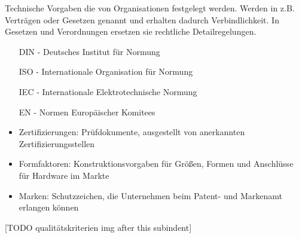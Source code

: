     \begin{tcolorbox}[width=11cm, center, title=Normen, coltitle=white, colframe=orange, colback=white!60!orange]
        Technische Vorgaben die von Organisationen festgelegt werden. Werden in z.B. Verträgen oder Gesetzen genannt und erhalten dadurch Verbindlichkeit.
        In Gesetzen und Verordnungen ersetzen sie rechtliche Detailregelungen.
    \end{tcolorbox}
    \begin{tcolorbox}[width=10cm, center, title=Abkürzungen, coltitle=white, colframe=white!20!blue, colback=white!80!blue]
        \begin{itemize}[itemsep=0.01em, parsep=0.3em]
            \item[DIN -] Deutsches Institut für Normung
            \item[ISO -] Internationale Organisation für Normung
            \item[IEC -] Internationale Elektrotechnische Normung
            \item[EN -] Normen Europäischer Komitees 
        \end{itemize}
    \end{tcolorbox}
    \begin{subindent}
        \begin{itemize}[leftmargin=2.5cm, topsep=0.3em, itemsep=0.1em, parsep=0.5em]
            \item Zertifizierungen: Prüfdokumente, ausgestellt von anerkannten Zertifizierungsstellen
            \item Formfaktoren: Konstruktionsvorgaben für Größen, Formen und Anschlüsse für Hardware im Markte
            \item Marken: Schutzzeichen, die Unternehmen beim Patent- und Markenamt erlangen können   
        \end{itemize}
        [TODO qualitätskriterien img after this subindent]
    \end{subindent}
